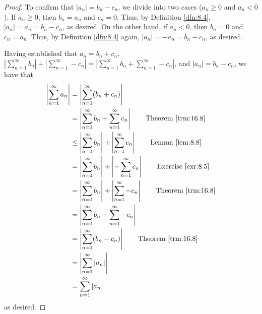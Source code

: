 \documentclass[../main.tex]{subfiles}
\begin{document}
\begin{theorem}
\begin{proof}
        To confirm that $|a_n|=b_n-c_n$, we divide into two cases ($a_n\geq 0$ and $a_n<0$). If $a_n\geq 0$, then $b_n=a_n$ and $c_n=0$. Thus, by Definition \ref{dfn:8.4}, $|a_n|=a_n=b_n-c_n$, as desired. On the other hand, if $a_n<0$, then $b_n=0$ and $c_n=a_n$. Thus, by Definition \ref{dfn:8.4} again, $|a_n|=-a_n=b_n-c_n$, as desired.\par
        Having established that $a_n=b_n+c_n$, $|\sum_{n=1}^\infty b_n|+|\sum_{n=1}^\infty -c_n|=|\sum_{n=1}^\infty b_n+\sum_{n=1}^\infty -c_n|$, and $|a_n|=b_n-c_n$, we have that
        \begin{align*}
            \left| \sum_{n=1}^\infty a_n \right| &= \left| \sum_{n=1}^\infty(b_n+c_n) \right|\\
            &= \left| \sum_{n=1}^\infty b_n+\sum_{n=1}^\infty c_n \right|\tag*{Theorem \ref{trm:16.8}}\\
            &\leq \left| \sum_{n=1}^\infty b_n \right|+\left| \sum_{n=1}^\infty c_n \right|\tag*{Lemma \ref{lem:8.8}}\\
            &= \left| \sum_{n=1}^\infty b_n \right|+\left| -\sum_{n=1}^\infty c_n \right|\tag*{Exercise \ref{exr:8.5}}\\
            &= \left| \sum_{n=1}^\infty b_n \right|+\left| \sum_{n=1}^\infty -c_n \right|\tag*{Theorem \ref{trm:16.8}}\\
            &= \left| \sum_{n=1}^\infty b_n+\sum_{n=1}^\infty -c_n \right|\\
            &= \left| \sum_{n=1}^\infty(b_n-c_n) \right|\tag*{Theorem \ref{trm:16.8}}\\
            &= \left| \sum_{n=1}^\infty|a_n| \right|\\
            &= \sum_{n=1}^\infty|a_n|
        \end{align*}
        as desired.
    \end{proof}
\end{theorem}
\end{document}
